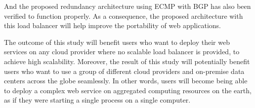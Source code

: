   And the proposed redundancy architecture using ECMP with BGP has also been verified to function properly.
  As a consequence, the proposed architecture with this load balancer will help improve the portability of web applications.


The outcome of this study will benefit users who want to deploy their web services on any cloud provider where no scalable load balancer is provided, to achieve high scalability.
Moreover, the result of this study will potentially benefit users who want to use a group of different cloud providers and on-premise data centers across the globe seamlessly.
In other words, users will become being able to deploy a complex web service on aggregated computing resources on the earth, as if they were starting a single process on a single computer.



 
